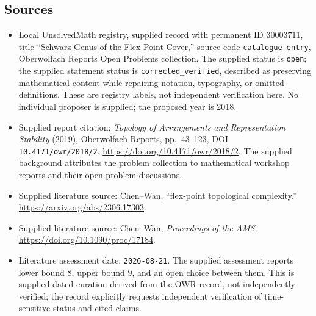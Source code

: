 \documentclass[11pt]{article}
\begin{document}
\subsection{Sources}
\begin{itemize}
\item Local UnsolvedMath registry, supplied record with permanent ID \(30003711\), title ``Schwarz Genus of the Flex-Point Cover,'' source code \texttt{catalogue entry}, Oberwolfach Reports Open Problems collection. The supplied status is \texttt{open}; the supplied statement status is \texttt{corrected\_verified}, described as preserving mathematical content while repairing notation, typography, or omitted definitions. These are registry labels, not independent verification here. No individual proposer is supplied; the proposed year is 2018.
\item Supplied report citation: \emph{Topology of Arrangements and Representation Stability} (2019), Oberwolfach Reports, pp.~43--123, DOI \texttt{10.4171/owr/2018/2}. \url{https://doi.org/10.4171/owr/2018/2}. The supplied background attributes the problem collection to mathematical workshop reports and their open-problem discussions.
\item Supplied literature source: Chen--Wan, ``flex-point topological complexity.'' \url{https://arxiv.org/abs/2306.17303}.
\item Supplied literature source: Chen--Wan, \emph{Proceedings of the AMS}. \url{https://doi.org/10.1090/proc/17184}.
\item Literature assessment date: \texttt{2026-08-21}. The supplied assessment reports lower bound \(8\), upper bound \(9\), and an open choice between them. This is supplied dated curation derived from the OWR record, not independently verified; the record explicitly requests independent verification of time-sensitive status and cited claims.
\end{itemize}
\end{document}
